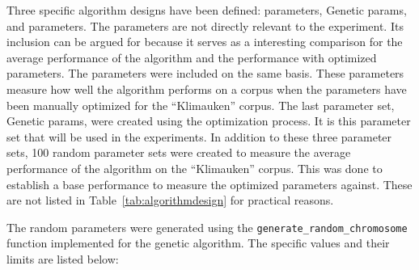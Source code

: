 Three specific algorithm designs have been defined: \citeauthor{Oren1998} parameters, Genetic params, and \citeauthor{Moe2014} parameters. The \citeauthor{Oren1998} parameters are not directly relevant to the experiment. Its inclusion can be argued for because it serves as a interesting comparison for the average performance of the algorithm and the performance with optimized parameters. The \citeauthor{Moe2014} parameters were included on the same basis. These parameters measure how well the algorithm performs on a corpus when the parameters have been manually optimized for the ``Klimauken'' corpus. The last parameter set, Genetic params, were created using the \GA optimization process. It is this parameter set that will be used in the experiments. In addition to these three parameter sets, 100 random parameter sets were created to measure the average performance of the \CTC algorithm on the ``Klimauken'' corpus. This was done to establish a base performance to measure the optimized parameters against. These are not listed in Table~\ref{tab:algorithmdesign} for practical reasons.

The random parameters were generated using the \texttt{generate\_random\_chromosome} function implemented for the genetic algorithm. The specific values and their limits are listed below:

